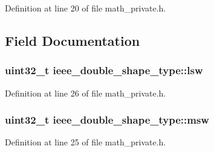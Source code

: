 Definition at line 20 of file math\-\_\-private.\-h.



\subsection{Field Documentation}
\hypertarget{unionieee__double__shape__type_a31323ff275e4b9f21d1f0dac6ed02a97}{
\subsubsection[{lsw}]{\setlength{\rightskip}{0pt plus 5cm}uint32\-\_\-t ieee\-\_\-double\-\_\-shape\-\_\-type\-::lsw}}\label{unionieee__double__shape__type_a31323ff275e4b9f21d1f0dac6ed02a97}


Definition at line 26 of file math\-\_\-private.\-h.

\hypertarget{unionieee__double__shape__type_a887ac49e741cafa9c74aa397a6fa04a5}{
\subsubsection[{msw}]{\setlength{\rightskip}{0pt plus 5cm}uint32\-\_\-t ieee\-\_\-double\-\_\-shape\-\_\-type\-::msw}}\label{unionieee__double__shape__type_a887ac49e741cafa9c74aa397a6fa04a5}


Definition at line 25 of file math\-\_\-private.\-h.

